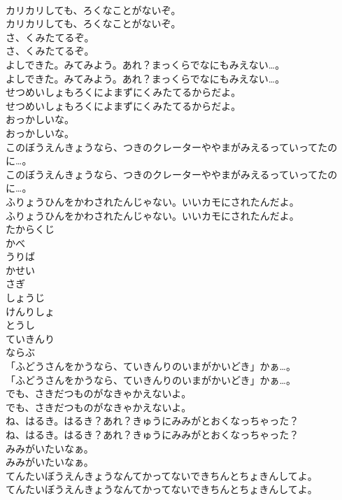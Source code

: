 \documentclass[8pt]{extreport}
\begin{document}
\begin{CJK}{UTF8}{min}
\\	カリカリしても、ろくなことがないぞ。
\\	カリカリしても、ろくなことがないぞ。
\\	さ、くみたてるぞ。
\\	さ、くみたてるぞ。
\\	よしできた。みてみよう。あれ？まっくらでなにもみえない…。
\\	よしできた。みてみよう。あれ？まっくらでなにもみえない…。
\\	せつめいしょもろくによまずにくみたてるからだよ。
\\	せつめいしょもろくによまずにくみたてるからだよ。
\\	おっかしいな。
\\	おっかしいな。
\\	このぼうえんきょうなら、つきのクレーターややまがみえるっていってたのに…。
\\	このぼうえんきょうなら、つきのクレーターややまがみえるっていってたのに…。
\\	ふりょうひんをかわされたんじゃない。いいカモにされたんだよ。
\\	ふりょうひんをかわされたんじゃない。いいカモにされたんだよ。
\\	たからくじ
\\	かべ
\\	うりば
\\	かせい
\\	さぎ
\\	しょうじ
\\	けんりしょ
\\	とうし
\\	ていきんり
\\	ならぶ
\\	「ふどうさんをかうなら、ていきんりのいまがかいどき」かぁ…。
\\	「ふどうさんをかうなら、ていきんりのいまがかいどき」かぁ…。
\\	でも、さきだつものがなきゃかえないよ。
\\	でも、さきだつものがなきゃかえないよ。
\\	ね、はるき。はるき？あれ？きゅうにみみがとおくなっちゃった？
\\	ね、はるき。はるき？あれ？きゅうにみみがとおくなっちゃった？
\\	みみがいたいなぁ。
\\	みみがいたいなぁ。
\\	てんたいぼうえんきょうなんてかってないできちんとちょきんしてよ。
\\	てんたいぼうえんきょうなんてかってないできちんとちょきんしてよ。

\end{CJK}
\end{document}
